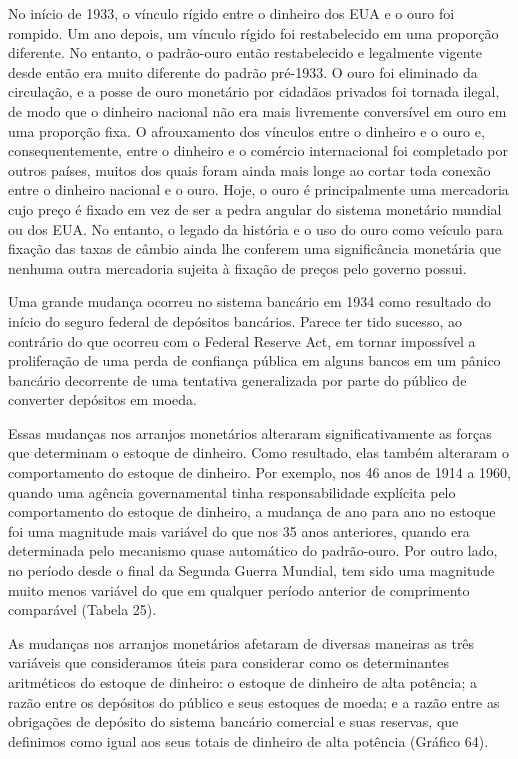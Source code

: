 \documentclass[a4paper,12pt]{article}[abntex2]
\begin{document}
No início de 1933, o vínculo rígido entre o dinheiro dos EUA e o ouro foi rompido. Um ano depois, um vínculo rígido foi restabelecido em uma proporção diferente. No entanto, o padrão-ouro então restabelecido e legalmente vigente desde então era muito diferente do padrão pré-1933. O ouro foi eliminado da circulação, e a posse de ouro monetário por cidadãos privados foi tornada ilegal, de modo que o dinheiro nacional não era mais livremente conversível em ouro em uma proporção fixa. O afrouxamento dos vínculos entre o dinheiro e o ouro e, consequentemente, entre o dinheiro e o comércio internacional foi completado por outros países, muitos dos quais foram ainda mais longe ao cortar toda conexão entre o dinheiro nacional e o ouro. Hoje, o ouro é principalmente uma mercadoria cujo preço é fixado em vez de ser a pedra angular do sistema monetário mundial ou dos EUA. No entanto, o legado da história e o uso do ouro como veículo para fixação das taxas de câmbio ainda lhe conferem uma significância monetária que nenhuma outra mercadoria sujeita à fixação de preços pelo governo possui.

Uma grande mudança ocorreu no sistema bancário em 1934 como resultado do início do seguro federal de depósitos bancários. Parece ter tido sucesso, ao contrário do que ocorreu com o Federal Reserve Act, em tornar impossível a proliferação de uma perda de confiança pública em alguns bancos em um pânico bancário decorrente de uma tentativa generalizada por parte do público de converter depósitos em moeda.

Essas mudanças nos arranjos monetários alteraram significativamente as forças que determinam o estoque de dinheiro. Como resultado, elas também alteraram o comportamento do estoque de dinheiro. Por exemplo, nos 46 anos de 1914 a 1960, quando uma agência governamental tinha responsabilidade explícita pelo comportamento do estoque de dinheiro, a mudança de ano para ano no estoque foi uma magnitude mais variável do que nos 35 anos anteriores, quando era determinada pelo mecanismo quase automático do padrão-ouro. Por outro lado, no período desde o final da Segunda Guerra Mundial, tem sido uma magnitude muito menos variável do que em qualquer período anterior de comprimento comparável (Tabela 25).

As mudanças nos arranjos monetários afetaram de diversas maneiras as três variáveis que consideramos úteis para considerar como os determinantes aritméticos do estoque de dinheiro: o estoque de dinheiro de alta potência; a razão entre os depósitos do público e seus estoques de moeda; e a razão entre as obrigações de depósito do sistema bancário comercial e suas reservas, que definimos como igual aos seus totais de dinheiro de alta potência (Gráfico 64).
\end{document}
